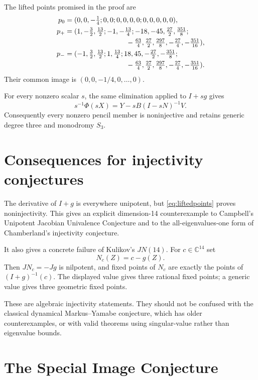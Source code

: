 \documentclass[11pt]{article}
\newcommand{\C}{\mathbb C}
\begin{document}
The lifted points promised in the proof are
\begingroup\small
\begin{align}
p_0={}&(0,0,-\tfrac14;0,0;0,0,0,0;0,0,0,0,0),\nonumber\\
p_+={}&(1,-\tfrac32,\tfrac{13}2;-1,-\tfrac{13}4;
-18,-45,\tfrac{27}2,\tfrac{351}8;\nonumber\\
&\hspace{26mm}-\tfrac{63}4,\tfrac{27}2,\tfrac{297}8,
-\tfrac{27}4,-\tfrac{351}{16}),\nonumber\\
p_-={}&(-1,\tfrac32,\tfrac{13}2;1,\tfrac{13}4;
18,45,-\tfrac{27}2,-\tfrac{351}8;\nonumber\\
&\hspace{26mm}-\tfrac{63}4,\tfrac{27}2,\tfrac{297}8,
-\tfrac{27}4,-\tfrac{351}{16}). \label{eq:liftedpoints}
\end{align}
\endgroup
Their common image is $(0,0,-1/4,0,\ldots,0)$.

For every nonzero scalar $s$, the same elimination applied to $I+sg$ gives
\[
 s^{-1}\Phi(sX)=Y-sB(I-sN)^{-1}V.
\]
Consequently every nonzero pencil member is noninjective and retains generic
degree three and monodromy $S_3$.

\section{Consequences for injectivity conjectures}

The derivative of $I+g$ is everywhere unipotent, but
\eqref{eq:liftedpoints} proves noninjectivity.  This gives an explicit
dimension-14 counterexample to Campbell's Unipotent Jacobian Univalence
Conjecture and to the all-eigenvalues-one form of Chamberland's injectivity
conjecture.

It also gives a concrete failure of Kulikov's $JN(14)$.  For
$c\in\C^{14}$ set
\[
 N_c(Z)=c-g(Z).
\]
Then $JN_c=-Jg$ is nilpotent, and fixed points of $N_c$ are exactly the
points of $(I+g)^{-1}(c)$.  The displayed value gives three rational fixed
points; a generic value gives three geometric fixed points.

These are algebraic injectivity statements.  They should not be confused
with the classical dynamical Markus--Yamabe conjecture, which has older
counterexamples, or with valid theorems using singular-value rather than
eigenvalue bounds.

\section{The Special Image Conjecture}
\end{document}
